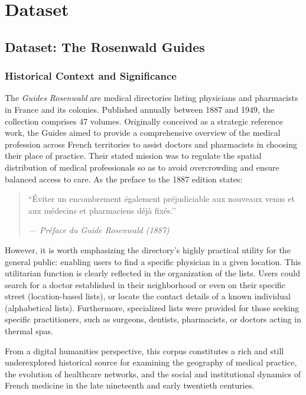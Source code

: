 \chapter{Dataset}
\section{Dataset: The Rosenwald Guides}
\subsection{Historical Context and Significance}
The \emph{Guides Rosenwald} are medical directories listing physicians and pharmacists in France and its colonies. Published annually between 1887 and 1949, the collection comprises 47 volumes. Originally conceived as a strategic reference work, the Guides aimed to provide a comprehensive overview of the medical profession across French territories to assist doctors and pharmacists in choosing their place of practice. Their stated mission was to regulate the spatial distribution of medical professionals so as to avoid overcrowding and ensure balanced access to care. As the preface to the 1887 edition states:

\begin{quote} ``Éviter un encombrement également préjudiciable aux nouveaux venus et aux médecins et pharmaciens déjà fixés.’’

\emph{— Préface du Guide Rosenwald (1887)} \end{quote}

However, it is worth emphasizing the directory’s highly practical utility for the general public: enabling users to find a specific physician in a given location. This utilitarian function is clearly reflected in the organization of the lists. Users could search for a doctor established in their neighborhood or even on their specific street (location-based lists), or locate the contact details of a known individual (alphabetical lists). Furthermore, specialized lists were provided for those seeking specific practitioners, such as surgeons, dentists, pharmacists, or doctors acting in thermal spas.


From a digital humanities perspective, this corpus constitutes a rich and still underexplored historical source for examining the geography of medical practice, the evolution of healthcare networks, and the social and institutional dynamics of French medicine in the late nineteenth and early twentieth centuries.

\clearpage
